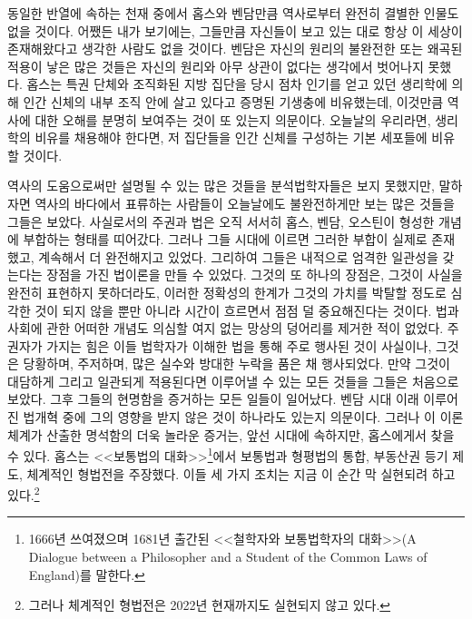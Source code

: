 동일한 반열에 속하는 천재 중에서
홉스와 벤담만큼 역사로부터 완전히 결별한 인물도 없을 것이다.
어쨌든 내가 보기에는,
그들만큼 자신들이 보고 있는 대로 항상 이 세상이 존재해왔다고 생각한 사람도
없을 것이다.
벤담은 자신의 원리의 불완전한 또는 왜곡된 적용이 낳은 많은 것들은
자신의 원리와 아무 상관이 없다는 생각에서 벗어나지 못했다.
홉스는
특권 단체와 조직화된 지방 집단을
당시 점차 인기를 얻고 있던 생리학에 의해
인간 신체의 내부 조직 안에 살고 있다고 증명된
기생충에 비유했는데,
이것만큼 역사에 대한 오해를 분명히 보여주는 것이 또 있는지 의문이다.
오늘날의 우리라면,
생리학의 비유를 채용해야 한다면,
저 집단들을
인간 신체를 구성하는 기본 세포들에
비유할 것이다.

역사의 도움으로써만 설명될 수 있는 많은 것들을
분석법학자들은 보지 못했지만,
말하자면
역사의 바다에서 표류하는 사람들이
오늘날에도
불완전하게만 보는 많은 것들을
그들은 보았다.
사실로서의 주권과 법은 오직 서서히
홉스, 벤담, 오스틴이 형성한 개념에 부합하는 형태를 띠어갔다.
그러나 그들 시대에 이르면 그러한 부합이 실제로 존재했고,
계속해서 더 완전해지고 있었다.
그리하여 그들은
내적으로 엄격한 일관성을 갖는다는 장점을 가진 법이론을 만들 수 있었다.
그것의 또 하나의 장점은,
그것이 사실을 완전히 표현하지 못하더라도,
이러한 정확성의 한계가 그것의 가치를 박탈할 정도로
심각한 것이 되지 않을 뿐만 아니라
시간이 흐르면서 점점 덜 중요해진다는 것이다.
법과 사회에 관한 어떠한 개념도
의심할 여지 없는 망상의 덩어리를 제거한 적이 없었다.
주권자가 가지는 힘은 이들 법학자가 이해한 법을 통해 주로 행사된 것이 사실이나,
그것은 당황하며, 주저하며, 많은 실수와 방대한 누락을 품은 채 행사되었다.
만약 그것이 대담하게 그리고 일관되게 적용된다면
이루어낼 수 있는 모든 것들을
그들은 처음으로 보았다.
그후 그들의 현명함을 증거하는 모든 일들이 일어났다.
벤담 시대 이래 이루어진 법개혁 중에 그의 영향을 받지 않은 것이 하나라도 있는지
의문이다.
그러나 이 이론체계가 산출한
명석함의 더욱 놀라운 증거는, 앞선 시대에 속하지만, 홉스에게서 찾을 수 있다.
홉스는 <<보통법의 대화>>\footnote{%
  1666년 쓰여졌으며 1681년 출간된
  <<철학자와 보통법학자의 대화>>(A Dialogue between
  a Philosopher and a Student of the Common Laws of England)를 말한다.
}에서
보통법과 형평법의 통합, 부동산권 등기 제도, 체계적인 형법전을 주장했다.
이들 세 가지 조치는 지금 이 순간 막 실현되려 하고 있다.\footnote{%
  그러나 체계적인 형법전은 2022년 현재까지도 실현되지 않고 있다. }

